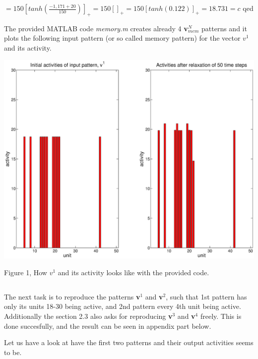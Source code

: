 \documentclass{article}
\begin{document}
$=150 [tanh(\frac{-1,171+20}{150})]_+=150[]_+=150[tanh(0.122)]_+=18.731=c$  \;\;\;\;     qed \newline

The provided MATLAB code \textit{memory.m} creates already 4 \textbf{v}$^N_{mem}$ patterns and it plots the following input pattern (or so called memory pattern) for the vector $v^1$ and its activity.

\begin{center}
\includegraphics[width=\textwidth]{memory_pure.eps}
\begin{footnotesize}
 Figure 1, How $v^1$ and its activity looks like with the provided code. 
\end{footnotesize}
\end{center}

\subsection{}
The next task is to reproduce the patterns \textbf{v}$^1$ and \textbf{v}$^2$, such that 1st pattern has only its units 18-30 being active, and 2nd pattern every 4th unit being active. Additionally the section 2.3 also asks for reproducing \textbf{v}$^3$ and \textbf{v}$^4$ freely. This is done succesfully, and the result can be seen in appendix part below. 


Let us have a look at have the first two patterns and their output activities seems to be. 
\end{document}
